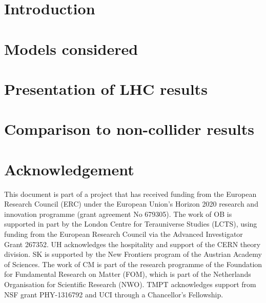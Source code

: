 \documentclass[review]{elsarticle}
\begin{document}
\maketitle

\section{Introduction}
%


\section{Models considered}
\label{sec:models}
%


\section{Presentation of LHC results}
\label{sec:colliderresults}
%


\section{Comparison to non-collider results}
\label{sec:comparisontonon-colliderresults}
%


\section{Acknowledgement} 
This document is part of a project that has received funding from the European Research Council (ERC) under the European Union's Horizon 2020 research and innovation programme (grant agreement No 679305). The work of OB is supported in part by the London Centre for Terauniverse Studies (LCTS), using funding from the European Research Council via the Advanced Investigator Grant 267352. UH acknowledges the hospitality and support of the CERN theory division.  SK is supported by the New Frontiers program of the Austrian Academy of Sciences.  The work of CM is part of the research programme of the Foundation for Fundamental Research on Matter (FOM), which is part of the Netherlands Organisation for Scientific Research (NWO). TMPT acknowledges support from NSF grant PHY-1316792 and UCI through a Chancellor's Fellowship. 
\end{document}
